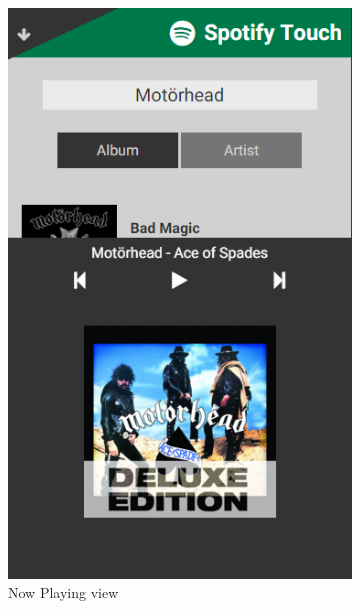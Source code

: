 \documentclass[conference]{IEEEtran}
\begin{document}
\begin{figure}[htbp]
\begin{subfigure}{0.45\columnwidth}
        \includegraphics[width=0.9\linewidth]{spotify_now_playing.png}
        \caption{Now Playing view}
        \label{fig:NowPlayingView}
    \end{subfigure}
    \begin{subfigure}{0.45\columnwidth}
        \centering

\end{subfigure}
\end{figure}
\end{document}
